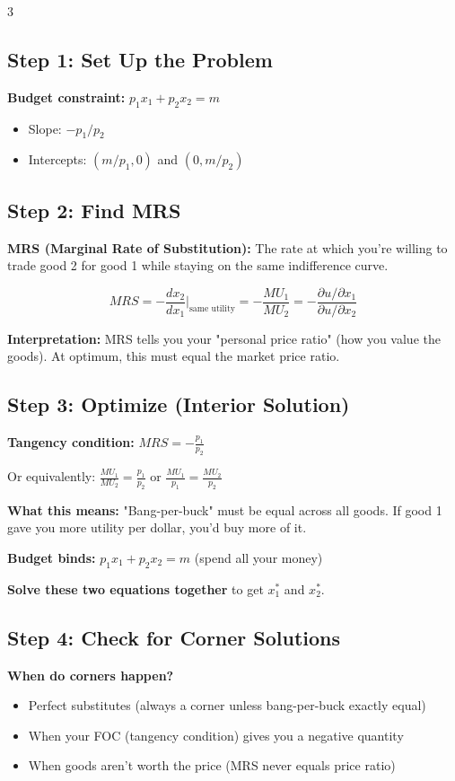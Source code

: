 \documentclass[10pt,landscape]{article}
\begin{document}
\begin{multicols}{3}
\subsection{Step 1: Set Up the Problem}
\textbf{Budget constraint:} $p_1 x_1 + p_2 x_2 = m$
\begin{itemize}[leftmargin=*,noitemsep,topsep=0pt]
\item Slope: $-p_1/p_2$
\item Intercepts: $(m/p_1, 0)$ and $(0, m/p_2)$
\end{itemize}

\subsection{Step 2: Find MRS}
\textbf{MRS (Marginal Rate of Substitution):} The rate at which you're willing to trade good 2 for good 1 while staying on the same indifference curve.

$$MRS = -\frac{dx_2}{dx_1}\Big|_{\text{same utility}} = -\frac{MU_1}{MU_2} = -\frac{\partial u/\partial x_1}{\partial u/\partial x_2}$$

\textbf{Interpretation:} MRS tells you your "personal price ratio" (how you value the goods). At optimum, this must equal the market price ratio.

\subsection{Step 3: Optimize (Interior Solution)}
\textbf{Tangency condition:} $MRS = -\frac{p_1}{p_2}$

Or equivalently: $\frac{MU_1}{MU_2} = \frac{p_1}{p_2}$ or $\frac{MU_1}{p_1} = \frac{MU_2}{p_2}$

\textbf{What this means:} "Bang-per-buck" must be equal across all goods. If good 1 gave you more utility per dollar, you'd buy more of it.

\textbf{Budget binds:} $p_1 x_1 + p_2 x_2 = m$ (spend all your money)

\textbf{Solve these two equations together} to get $x_1^*$ and $x_2^*$.

\subsection{Step 4: Check for Corner Solutions}
\textbf{When do corners happen?}
\begin{itemize}[leftmargin=*,noitemsep,topsep=0pt]
\item Perfect substitutes (always a corner unless bang-per-buck exactly equal)
\item When your FOC (tangency condition) gives you a negative quantity
\item When goods aren't worth the price (MRS never equals price ratio)
\end{itemize}


\end{multicols}
\end{document}
